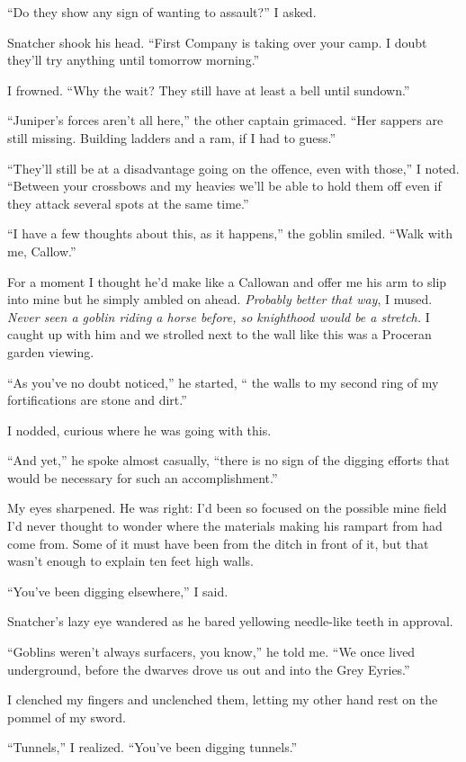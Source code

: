 \documentclass[12pt, openany]{book}
\begin{document}
“Do they show any sign of wanting to assault?” I asked.

Snatcher shook his head. “First Company is taking over your camp. I doubt they’ll try anything until tomorrow morning.”

I frowned. “Why the wait? They still have at least a bell until sundown.”

“Juniper’s forces aren’t all here,” the other captain grimaced. “Her sappers are still missing. Building ladders and a ram, if I had to guess.”

“They’ll still be at a disadvantage going on the offence, even with those,” I noted. “Between your crossbows and my heavies we’ll be able to hold them off even if they attack several spots at the same time.”

“I have a few thoughts about this, as it happens,” the goblin smiled. “Walk with me, Callow.”

For a moment I thought he’d make like a Callowan and offer me his arm to slip into mine but he simply ambled on ahead.\textit{ Probably better that way}, I mused. \textit{Never seen a goblin riding a horse before, so knighthood would be a stretch.} I caught up with him and we strolled next to the wall like this was a Proceran garden viewing.

“As you’ve no doubt noticed,” he started, “ the walls to my second ring of my fortifications are stone and dirt.”

I nodded, curious where he was going with this.

“And yet,” he spoke almost casually, “there is no sign of the digging efforts that would be necessary for such an accomplishment.”

My eyes sharpened. He was right: I’d been so focused on the possible mine field I’d never thought to wonder where the materials making his rampart from had come from. Some of it must have been from the ditch in front of it, but that wasn’t enough to explain ten feet high walls.

“You’ve been digging elsewhere,” I said.

Snatcher’s lazy eye wandered as he bared yellowing needle-like teeth in approval.

“Goblins weren’t always surfacers, you know,” he told me. “We once lived underground, before the dwarves drove us out and into the Grey Eyries.”

I clenched my fingers and unclenched them, letting my other hand rest on the pommel of my sword.

“Tunnels,” I realized. “You’ve been digging tunnels.”
\end{document}
